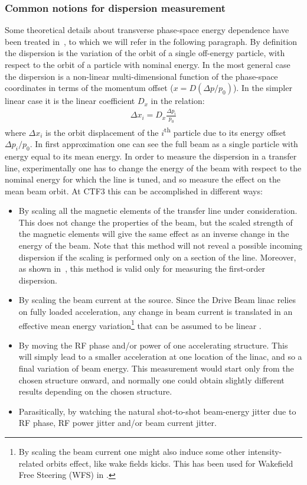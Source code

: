 \subsubsection{Common notions for dispersion measurement}
\label{sub:detailDispMeas}
%
Some theoretical details about transverse phase-space energy dependence have been treated
in~\cite{bib:DavideThesis}, to which we will refer in the following paragraph.
By definition~\cite{Minty:629879} the dispersion is the variation of the orbit of a single
off-energy particle, with respect to the orbit of a particle with nominal energy.
In the most general case the dispersion is a non-linear multi-dimensional function of the
phase-space coordinates in terms of the momentum offset ($x = D(\Delta p/p_0)$).
In the simpler linear case it is the linear coefficient $D_x$ in the relation:
\begin{align}
\Delta x_i = D_x \frac{\Delta p_i}{p_0}
\label{eq:simpleLinearDispersionDefinition}
\end{align}
where $\Delta x_i$ is the orbit displacement of the $i$\textsuperscript{th} particle due
to its energy offset $\Delta p_i/p_0$.
In first approximation one can see the full beam as a single particle with energy equal to
its mean energy.  
In order to measure the dispersion in a transfer line, experimentally one has to change
the energy of the beam with respect to the nominal energy for which the line is tuned,
and so measure the effect on the mean beam orbit.
At CTF3 this can be accomplished in different ways:
%
\begin{itemize}
\item
By scaling all the magnetic elements of the transfer line under consideration. This does
not change the properties of the beam, but the scaled strength of the magnetic elements
will give the same effect as an inverse change in the energy of the beam. 
Note that this method will not reveal a possible incoming dispersion if the scaling is
performed only on a section of the line.
Moreover, as shown in~\cite{bib:DavideThesis}, this method is valid only for measuring
the first-order dispersion.
\item
By scaling the beam current at the source. Since the Drive Beam linac relies on fully
loaded acceleration, any change in beam current is translated in an effective mean energy
variation\footnote{By scaling the beam current one might also induce some other
intensity-related orbits effect, like wake fields kicks. This has been used for Wakefield
Free Steering (WFS) in \cite{Latina:2014jca, Latina:2014ama}.} that can be assumed to be
linear \cite{bib:CTF3DesignReport}.
\item
By moving the RF phase and/or power of one accelerating structure. This will simply lead
to a smaller acceleration at one location of the linac, and so a final variation of beam
energy. This measurement would start only from the chosen structure onward, and normally
one could obtain slightly different results depending on the chosen structure.
\item
Parasitically, by watching the natural shot-to-shot beam-energy jitter due to RF phase, 
RF power jitter and/or beam current jitter.
\end{itemize}
